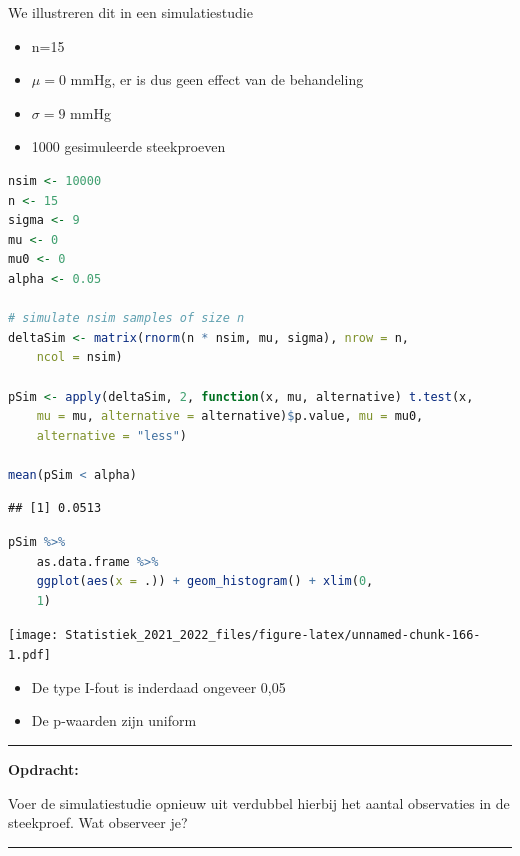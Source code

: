 \documentclass[
  12pt,dutch,coursenotes]{book}
\providecommand{\tightlist}{%
  \setlength{\itemsep}{0pt}\setlength{\parskip}{0pt}}
\theoremstyle{definition}
\theoremstyle{definition}
\theoremstyle{definition}
\theoremstyle{definition}
\theoremstyle{remark}
\begin{document}
We illustreren dit in een simulatiestudie

\begin{itemize}
\tightlist
\item
  n=15
\item
  \(\mu=0\) mmHg, er is dus geen effect van de behandeling
\item
  \(\sigma =9\) mmHg
\item
  1000 gesimuleerde steekproeven
\end{itemize}

\begin{lstlisting}[language=R]
nsim <- 10000
n <- 15
sigma <- 9
mu <- 0
mu0 <- 0
alpha <- 0.05

# simulate nsim samples of size n
deltaSim <- matrix(rnorm(n * nsim, mu, sigma), nrow = n,
    ncol = nsim)

pSim <- apply(deltaSim, 2, function(x, mu, alternative) t.test(x,
    mu = mu, alternative = alternative)$p.value, mu = mu0,
    alternative = "less")

mean(pSim < alpha)
\end{lstlisting}

\begin{lstlisting}
## [1] 0.0513
\end{lstlisting}

\begin{lstlisting}[language=R]
pSim %>%
    as.data.frame %>%
    ggplot(aes(x = .)) + geom_histogram() + xlim(0,
    1)
\end{lstlisting}

\texttt{[image: Statistiek\_2021\_2022\_files/figure-latex/unnamed-chunk-166-1.pdf]}

\begin{itemize}
\tightlist
\item
  De type I-fout is inderdaad ongeveer 0,05
\item
  De p-waarden zijn uniform
\end{itemize}

\begin{center}\rule{0.5\linewidth}{0.5pt}\end{center}

\textbf{Opdracht:}

Voer de simulatiestudie opnieuw uit verdubbel hierbij het aantal observaties in de steekproef. Wat observeer je?

\begin{center}\rule{0.5\linewidth}{0.5pt}\end{center}
\end{document}
